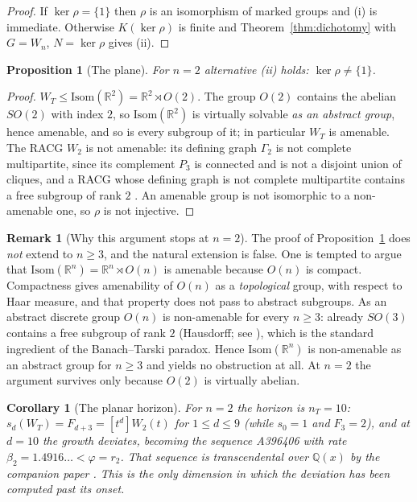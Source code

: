 \documentclass[11pt]{article}
\newcommand{\R}{\mathbb{R}}
\newcommand{\Q}{\mathbb{Q}}
\newtheorem{proposition}[theorem]{Proposition}
\newtheorem{corollary}[theorem]{Corollary}
\theoremstyle{definition}
\newtheorem{remark}[theorem]{Remark}
\begin{document}
\begin{proof}
If $\ker\rho=\{1\}$ then $\rho$ is an isomorphism of marked groups and (i) is immediate. Otherwise
$K(\ker\rho)$ is finite and Theorem~\ref{thm:dichotomy} with $G=W_n$, $N=\ker\rho$ gives (ii).
\end{proof}

\begin{proposition}[The plane]
\label{prop:quotient}
For $n=2$ alternative (ii) holds: $\ker\rho\ne\{1\}$.
\end{proposition}

\begin{proof}
$W_T\le\mathrm{Isom}(\R^2)=\R^2\rtimes O(2)$. The group $O(2)$ contains the abelian $SO(2)$ with index
$2$, so $\mathrm{Isom}(\R^2)$ is virtually solvable \emph{as an abstract group}, hence amenable, and so
is every subgroup of it; in particular $W_T$ is amenable. The RACG $W_2$ is not amenable: its defining
graph $\Gamma_2$ is not complete multipartite, since its complement $P_3$ is connected and is not a
disjoint union of cliques, and a RACG whose defining graph is not complete multipartite contains a free
subgroup of rank $2$ \cite{Davis}. An amenable group is not isomorphic to a non-amenable one, so
$\rho$ is not injective.
\end{proof}

\begin{remark}[Why this argument stops at $n=2$]
\label{rem:amenability-fails}
The proof of Proposition~\ref{prop:quotient} does \emph{not} extend to $n\ge3$, and the natural
extension is false. One is tempted to argue that $\mathrm{Isom}(\R^n)=\R^n\rtimes O(n)$ is amenable
because $O(n)$ is compact. Compactness gives amenability of $O(n)$ as a \emph{topological} group, with
respect to Haar measure, and that property does not pass to abstract subgroups. As an abstract discrete
group $O(n)$ is non-amenable for every $n\ge3$: already $SO(3)$ contains a free subgroup of rank $2$
(Hausdorff; see \cite[Thm.~2.1]{Wagon}), which is the standard ingredient of the Banach--Tarski
paradox. Hence $\mathrm{Isom}(\R^n)$ is non-amenable as an abstract group for $n\ge3$ and yields no
obstruction at all. At $n=2$ the argument survives only because $O(2)$ is virtually abelian.
\end{remark}

\begin{corollary}[The planar horizon]
\label{cor:plane}
For $n=2$ the horizon is $n_T=10$: $s_d(W_T)=F_{d+3}=[t^d]W_2(t)$ for $1\le d\le9$ (while $s_0=1$ and
$F_3=2$), and at $d=10$ the growth deviates, becoming the sequence \textup{A396406} with rate
$\beta_2=1.4916\ldots<\varphi=r_2$. That sequence is transcendental over $\Q(x)$ by the companion paper
\cite{Bonfioli1}. This is the only dimension in which the deviation has been computed past its onset.
\end{corollary}
\end{document}
